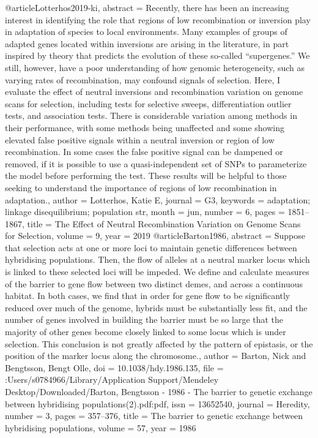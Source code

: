@article{Lotterhos2019-ki,
abstract = {Recently, there has been an increasing interest in identifying
the role that regions of low recombination or inversion play in
adaptation of species to local environments. Many examples of
groups of adapted genes located within inversions are arising in
the literature, in part inspired by theory that predicts the
evolution of these so-called ``supergenes.'' We still, however,
have a poor understanding of how genomic heterogeneity, such as
varying rates of recombination, may confound signals of
selection. Here, I evaluate the effect of neutral inversions and
recombination variation on genome scans for selection, including
tests for selective sweeps, differentiation outlier tests, and
association tests. There is considerable variation among methods
in their performance, with some methods being unaffected and some
showing elevated false positive signals within a neutral
inversion or region of low recombination. In some cases the false
positive signal can be dampened or removed, if it is possible to
use a quasi-independent set of SNPs to parameterize the model
before performing the test. These results will be helpful to
those seeking to understand the importance of regions of low
recombination in adaptation.},
author = {Lotterhos, Katie E},
journal = {G3},
keywords = {adaptation; linkage disequilibrium; population str},
month = {jun},
number = {6},
pages = {1851--1867},
title = {{The Effect of Neutral Recombination Variation on Genome Scans for Selection}},
volume = {9},
year = {2019}
}
@article{Barton1986,
abstract = {Suppose that selection acts at one or more loci to maintain genetic differences between hybridising populations. Then, the flow of alleles at a neutral marker locus which is linked to these selected loci will be impeded. We define and calculate measures of the barrier to gene flow between two distinct demes, and across a continuous habitat. In both cases, we find that in order for gene flow to be significantly reduced over much of the genome, hybrids must be substantially less fit, and the number of genes involved in building the barrier must be so large that the majority of other genes become closely linked to some locus which is under selection. This conclusion is not greatly affected by the pattern of epistasis, or the position of the marker locus along the chromosome.},
author = {Barton, Nick and Bengtsson, Bengt Olle},
doi = {10.1038/hdy.1986.135},
file = {:Users/s0784966/Library/Application Support/Mendeley Desktop/Downloaded/Barton, Bengtsson - 1986 - The barrier to genetic exchange between hybridising populations(2).pdf:pdf},
issn = {13652540},
journal = {Heredity},
number = {3},
pages = {357--376},
title = {{The barrier to genetic exchange between hybridising populations}},
volume = {57},
year = {1986}
}
